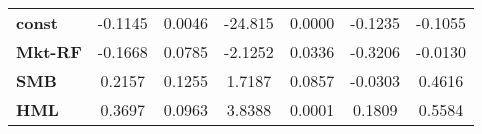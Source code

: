 \begin{center}
\begin{tabular}{lcccccc}
\midrule
\textbf{const}  &      -0.1145       &       0.0046       &     -24.815     &      0.0000      &      -0.1235      &      -0.1055       \\
\textbf{Mkt-RF} &      -0.1668       &       0.0785       &     -2.1252     &      0.0336      &      -0.3206      &      -0.0130       \\
\textbf{SMB}    &       0.2157       &       0.1255       &      1.7187     &      0.0857      &      -0.0303      &       0.4616       \\
\textbf{HML}    &       0.3697       &       0.0963       &      3.8388     &      0.0001      &       0.1809      &       0.5584       \\
\bottomrule
\end{tabular}
\end{center}
